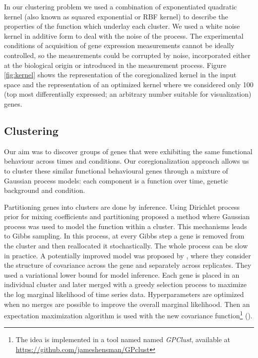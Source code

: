 In our clustering problem we used a combination of exponentiated quadratic kernel (also known as squared exponential or RBF kernel) to describe the properties of the function which underlay each cluster. We used a white noise kernel in additive form to deal with the noise of the process. The experimental conditions of acquisition of gene expression measurements cannot be ideally controlled, so the measurements could be corrupted by noise, incorporated either at the biological origin or introduced in the measurement process. Figure \ref{fig:kernel} shows the representation of the coregionalized kernel in the input space and the representation of an optimized kernel where we considered only 100 (top most differentially expressed; an arbitrary number suitable for visualization) genes.

\subsection{Clustering}
Our aim was to discover groups of genes that were exhibiting the same functional behaviour across times and conditions. Our coregionalization approach allows us to cluster these similar functional behavioural genes through a mixture of Gaussian process models: each component is a function over time, genetic background and condition.

Partitioning genes into clusters are done by inference. Using Dirichlet process prior for mixing coefficients and partitioning \cite{Dunson:2010} proposed a method where Gaussian process was used to model the function within a cluster. This mechanisms leads to Gibbs sampling. In this process, at every Gibbs step a gene is removed from the cluster and then reallocated it stochastically. The whole process can be slow in practice. A potentially improved model was proposed by \cite{Hensman:2013}, where they consider the structure of covariance across the gene and separately across replicates. They used a variational lower bound for model inference. Each gene is placed in an individual cluster and later merged with a greedy selection process to maximize the log marginal likelihood of time series data. Hyperparameters are optimized when no merges are possible to improve the overall marginal likelihood. Then an expectation maximization algorithm is used with the new covariance function\footnote{The idea is implemented in a tool named named \emph{GPClust}, available at \url{https://github.com/jameshensman/GPclust}} (\cite{Hensman:2013}).

